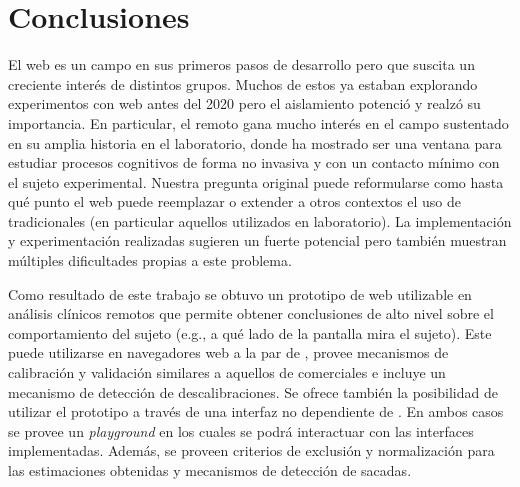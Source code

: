 \chapter{Conclusiones}

El \eyetracking web es un campo en sus primeros pasos de desarrollo pero que
suscita un creciente interés de distintos grupos.
Muchos de estos ya estaban explorando experimentos con \eyetracking web antes
del 2020 pero el aislamiento potenció y realzó su importancia.
En particular, el \eyetracking remoto gana mucho interés en el campo sustentado
en su amplia historia en el laboratorio, donde ha mostrado ser una ventana para
estudiar procesos cognitivos de forma no invasiva y con un contacto mínimo con
el sujeto experimental.
Nuestra pregunta original puede reformularse como hasta qué punto el
\eyetracking web puede reemplazar o extender a otros contextos el uso de
\eyetrackers tradicionales (en particular aquellos utilizados en laboratorio).
La implementación y experimentación realizadas sugieren un fuerte potencial
pero también muestran múltiples dificultades propias a este problema.

Como resultado de este trabajo se obtuvo un prototipo de \eyetracker web
utilizable en análisis clínicos remotos que permite obtener conclusiones de
alto nivel sobre el comportamiento del sujeto (e.g., a qué lado de la pantalla
mira el sujeto).
Este puede utilizarse en navegadores web a la par de \jspsych, provee
mecanismos de calibración y validación similares a aquellos de \eyetrackers
comerciales e incluye un mecanismo de detección de descalibraciones.
Se ofrece también la posibilidad de utilizar el prototipo a través de una
interfaz no dependiente de \jspsych.
En ambos casos se provee un \textit{playground} en los cuales se podrá
interactuar con las interfaces implementadas.
Además, se proveen criterios de exclusión y normalización para las estimaciones
obtenidas y mecanismos de detección de sacadas.

